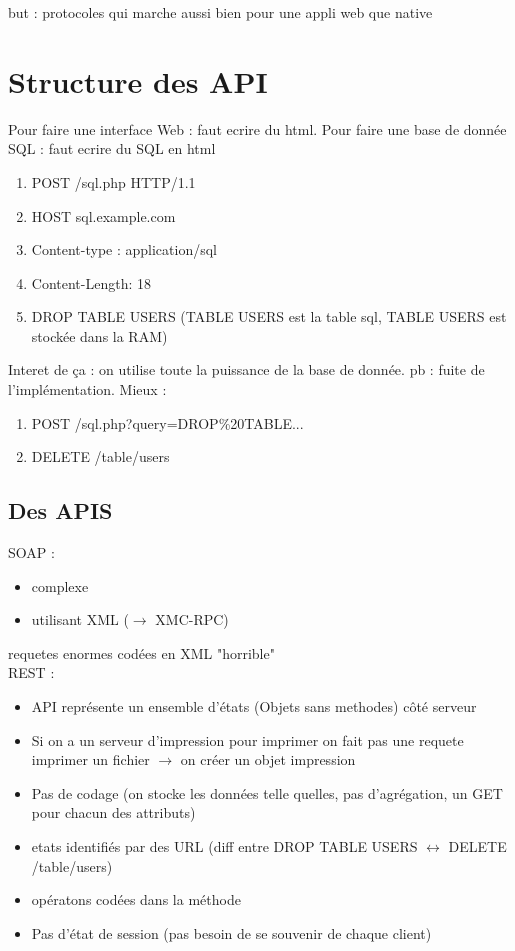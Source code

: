 \documentclass[12pt]{article}
\theoremstyle{plain}
\theoremstyle{definition}
\theoremstyle{remark}
\begin{document}
but : protocoles qui marche aussi bien pour une appli web que native
\section{Structure des API}
Pour faire une interface Web : faut ecrire du html. Pour faire une base de donnée SQL : faut ecrire du SQL en html
\begin{enumerate}
    \item POST /sql.php HTTP/1.1
    \item HOST sql.example.com
    \item Content-type : application/sql
    \item Content-Length: 18
    \item DROP TABLE USERS (TABLE USERS est la table sql, TABLE USERS est stockée dans la RAM)
\end{enumerate}
Interet de ça : on utilise toute la puissance de la base de donnée. pb : fuite de l'implémentation. Mieux :
\begin{enumerate}
    \item POST /sql.php?query=DROP\%20TABLE...
    \item DELETE /table/users
\end{enumerate}

\subsection{Des APIS}
SOAP :
\begin{itemize}
    \item  complexe
    \item utilisant XML ($\rightarrow$ XMC-RPC)
\end{itemize}
requetes enormes codées en XML "horrible"\\
REST :
\begin{itemize}
    \item API représente un ensemble d'états (Objets sans methodes) côté serveur
    \item Si on a un serveur d'impression pour imprimer on fait pas une requete imprimer un fichier $\rightarrow$ on créer un objet impression
    \item Pas de codage (on stocke les données telle quelles, pas d'agrégation, un GET pour chacun des attributs)
    \item etats identifiés par des URL (diff entre DROP TABLE USERS $\leftrightarrow$ DELETE /table/users)
    \item opératons codées dans la méthode 
    \item Pas d'état de session (pas besoin de se souvenir de chaque client)
\end{itemize}
\end{document}
